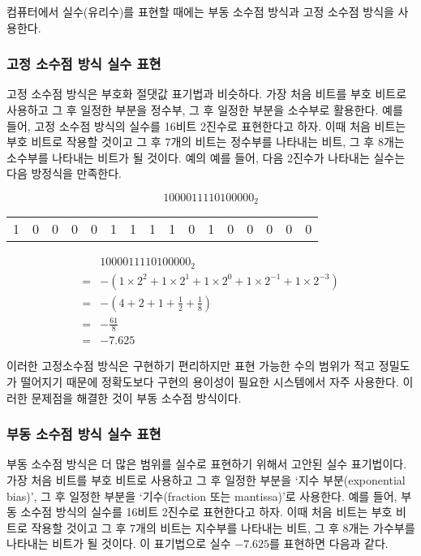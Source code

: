 \documentclass{article}
\begin{document}
컴퓨터에서 실수(유리수)를 표현할 때에는 부동 소수점 방식과 고정 소수점 방식을 사용한다.

\subsubsection{고정 소수점 방식 실수 표현}

고정 소수점 방식은 부호화 절댓값 표기법과 비슷하다. 가장 처음 비트를 부호 비트로 사용하고
그 후 일정한 부분을 정수부, 그 후 일정한 부분을 소수부로 활용한다.
예를 들어, 고정 소수점 방식의 실수를 16비트 2진수로 표현한다고 하자.
이때 처음 비트는 부호 비트로 작용할 것이고 그 후 7개의 비트는 정수부를 나타내는 비트,
그 후 8개는 소수부를 나타내는 비트가 될 것이다.
예의 예를 들어, 다음 2진수가 나타내는 실수는 다음 방정식을 만족한다.

$$
1 0000111 10100000_2
$$

\begin{center}
    \begin{tabular}{c|ccccccc|cccccccc}
        1 & 0 & 0 & 0 & 0 & 1 & 1 & 1 & 1 & 0 & 1 & 0 & 0 & 0 & 0 & 0
    \end{tabular}
\end{center}

$$
\begin{aligned}
    & 1000011110100000_2 \\
    =& -\left(1 \times 2^2 + 1 \times 2^1 + 1 \times 2^0 + 1 \times 2^{-1} + 1 \times 2^{-3}\right) \\
    =& -\left(4 + 2 + 1 + \frac{1}{2} + \frac{1}{8}\right) \\
    =& -\frac{61}{8} \\
    =& -7.625
\end{aligned}
$$

이러한 고정소수점 방식은 구현하기 편리하지만 표현 가능한 수의 범위가 적고 정밀도가 떨어지기
때문에 정확도보다 구현의 용이성이 필요한 시스템에서 자주 사용한다.
이러한 문제점을 해결한 것이 부동 소수점 방식이다.

\subsubsection{부동 소수점 방식 실수 표현}

부동 소수점 방식은 더 많은 범위를 실수로 표현하기 위해서 고안된 실수 표기법이다.
가장 처음 비트를 부호 비트로 사용하고 그 후 일정한 부분을 `지수 부분(exponential bias)',
그 후 일정한 부분을 `기수(fraction 또는 mantissa)'로 사용한다.
예를 들어, 부동 소수점 방식의 실수를 16비트 2진수로 표현한다고 하자.
이때 처음 비트는 부호 비트로 작용할 것이고 그 후 7개의 비트는 지수부를 나타내는 비트,
그 후 8개는 가수부를 나타내는 비트가 될 것이다.
이 표기법으로 실수 $-7.625$를 표현하면 다음과 같다.
\end{document}
